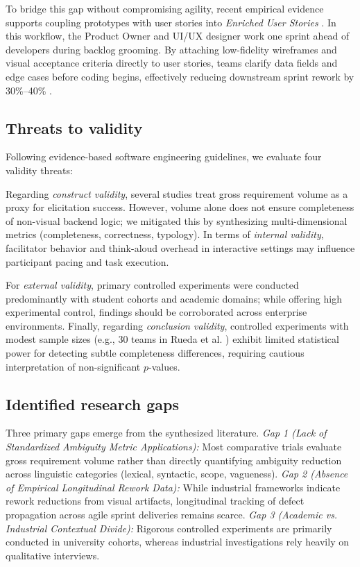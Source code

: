 \documentclass[conference]{IEEEtran}
\begin{document}
To bridge this gap without compromising agility, recent empirical evidence supports coupling prototypes with user stories into \textit{Enriched User Stories} \cite{acm2022proposal}. In this workflow, the Product Owner and UI/UX designer work one sprint ahead of developers during backlog grooming. By attaching low-fidelity wireframes and visual acceptance criteria directly to user stories, teams clarify data fields and edge cases before coding begins, effectively reducing downstream sprint rework by 30\%--40\% \cite{acm2022proposal}.

\subsection{Threats to validity}
Following evidence-based software engineering guidelines, we evaluate four validity threats:

Regarding \textit{construct validity}, several studies treat gross requirement volume as a proxy for elicitation success. However, volume alone does not ensure completeness of non-visual backend logic; we mitigated this by synthesizing multi-dimensional metrics (completeness, correctness, typology). In terms of \textit{internal validity}, facilitator behavior and think-aloud overhead in interactive settings \cite{abad2018loud} may influence participant pacing and task execution.

For \textit{external validity}, primary controlled experiments \cite{rueda2020requirements, diaz2021gender, uv2023empirical} were conducted predominantly with student cohorts and academic domains; while offering high experimental control, findings should be corroborated across enterprise environments. Finally, regarding \textit{conclusion validity}, controlled experiments with modest sample sizes (e.g., 30 teams in Rueda et al. \cite{rueda2020requirements}) exhibit limited statistical power for detecting subtle completeness differences, requiring cautious interpretation of non-significant $p$-values.

\subsection{Identified research gaps}
Three primary gaps emerge from the synthesized literature. \textit{Gap 1 (Lack of Standardized Ambiguity Metric Applications):} Most comparative trials evaluate gross requirement volume rather than directly quantifying ambiguity reduction across linguistic categories (lexical, syntactic, scope, vagueness). \textit{Gap 2 (Absence of Empirical Longitudinal Rework Data):} While industrial frameworks indicate rework reductions from visual artifacts, longitudinal tracking of defect propagation across agile sprint deliveries remains scarce. \textit{Gap 3 (Academic vs. Industrial Contextual Divide):} Rigorous controlled experiments are primarily conducted in university cohorts, whereas industrial investigations rely heavily on qualitative interviews.
\end{document}

